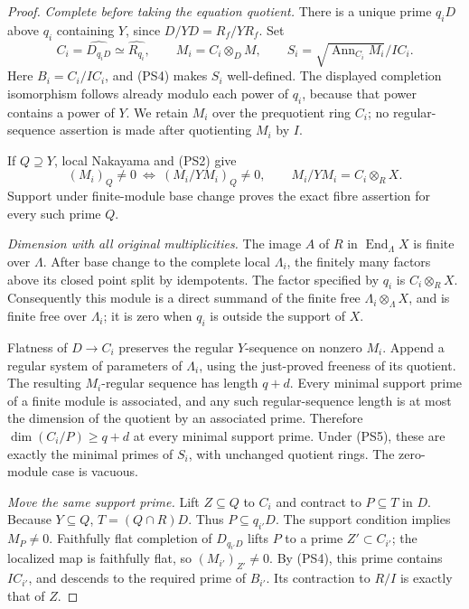 \begin{proof}
\emph{Complete before taking the equation quotient.}
There is a unique prime \(q_iD\) above \(q_i\) containing \(Y\),
since \(D/YD=R_f/YR_f\).  Set
\[
 C_i=\widehat{D_{q_iD}}\simeq\widehat{R_{q_i}},\qquad
 M_i=C_i\otimes_DM,\qquad
 S_i=\sqrt{\operatorname{Ann}_{C_i}M_i}/IC_i.
                                                               \tag{PS5}
\]
Here \(B_i=C_i/IC_i\), and (PS4) makes \(S_i\) well-defined.
The displayed completion isomorphism follows already modulo each
power of \(q_i\), because that power contains a power of \(Y\).
We retain \(M_i\) over the prequotient ring \(C_i\);
no regular-sequence assertion is made after quotienting \(M_i\)
by \(I\).

If \(Q\supseteq Y\), local Nakayama and (PS2) give
\[
 (M_i)_Q\ne0
 \ \Longleftrightarrow\
 (M_i/YM_i)_Q\ne0,\qquad
 M_i/YM_i=C_i\otimes_RX.
 \]
Support under finite-module base change proves the exact fibre
assertion for every such prime \(Q\).

\emph{Dimension with all original multiplicities.}
The image \(A\) of \(R\) in \(\operatorname{End}_\Lambda X\)
is finite over \(\Lambda\).  After base change to the complete
local \(\Lambda_i\), the finitely many factors above its closed
point split by idempotents.  The factor specified by \(q_i\)
is \(C_i\otimes_RX\).  Consequently this module is a direct
summand of the finite free \(\Lambda_i\otimes_\Lambda X\),
and is finite free over \(\Lambda_i\); it is zero when \(q_i\)
is outside the support of \(X\).

Flatness of \(D\to C_i\) preserves the regular \(Y\)-sequence
on nonzero \(M_i\).  Append a regular system of parameters
of \(\Lambda_i\), using the just-proved freeness of its quotient.
The resulting \(M_i\)-regular sequence has length \(q+d\).
Every minimal support prime of a finite module is associated,
and any such regular-sequence length is at most the dimension
of the quotient by an associated prime.  Therefore
\(\dim(C_i/P)\geq q+d\) at every minimal support prime.
Under (PS5), these are exactly the minimal primes of \(S_i\),
with unchanged quotient rings.  The zero-module case is vacuous.

\emph{Move the same support prime.}
Lift \(Z\subseteq Q\) to \(C_i\) and contract to
\(P\subseteq T\) in \(D\).  Because \(Y\subseteq Q\),
\(T=(Q\cap R)D\).  Thus \(P\subseteq q_{i'}D\).
The support condition implies \(M_P\ne0\).
Faithfully flat completion of \(D_{q_{i'}D}\) lifts \(P\)
to a prime \(Z'\subset C_{i'}\); the localized map is faithfully
flat, so \((M_{i'})_{Z'}\ne0\).  By (PS4), this prime contains
\(IC_{i'}\), and descends to the required prime of \(B_{i'}\).
Its contraction to \(R/I\) is exactly that of \(Z\).
\end{proof}

